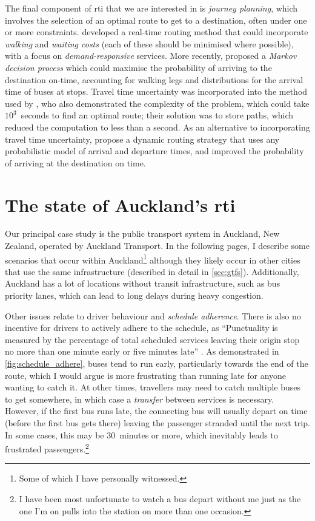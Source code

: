 The final component of \gls{rti} that we are interested in is \emph{journey planning}, which involves the selection of an optimal route to get to a destination, often under one or more constraints.  developed a real-time routing method that could incorporate \emph{walking} and \emph{waiting costs} (each of these should be minimised where possible), with a focus on \emph{demand-responsive} services. More recently, \citet{Hame_2013a,Hame_2013b} proposed a \emph{Markov decision process} which could maximise the probability of arriving to the destination on-time, accounting for walking legs and distributions for the arrival time of buses at stops. Travel time uncertainty was incorporated into the method used by \citet{Zheng_2016}, who also demonstrated the complexity of the problem, which could take $10^3$~seconds to find an optimal route; their solution was to store paths, which reduced the computation to less than a second. As an alternative to incorporating travel time uncertainty, \citet{Berczi_2017} propose a dynamic routing strategy that uses any probabilistic model of arrival and departure times, and improved the probability of arriving at the destination on time.



\section{The state of Auckland's \gls{rti}}
\label{sec:auckland_etas}

Our principal case study is the public transport system in Auckland, New Zealand, operated by Auckland Transport. In the following pages, I describe some scenarios that occur within Auckland\footnote{Some of which I have personally witnessed.} although they likely occur in other cities that use the same infrastructure (described in detail in \cref{sec:gtfs}). Additionally, Auckland has a lot of locations without transit infrastructure, such as bus priority lanes, which can lead to long delays during heavy congestion.


Other issues relate to driver behaviour and \emph{schedule adherence}. There is also no incentive for drivers to actively adhere to the schedule, as ``Punctuality is measured by the percentage of total scheduled services leaving their origin stop no more than one minute early or five minutes late'' \citep[13]{AT_report_2019}. As demonstrated in \cref{fig:schedule_adhere}, buses tend to run early, particularly towards the end of the route, which I would argue is more frustrating than running late for anyone wanting to catch it. At other times, travellers may need to catch multiple buses to get somewhere, in which case a \emph{transfer} between services is necessary. However, if the first bus runs late, the connecting bus will usually depart on time (before the first bus gets there) leaving the passenger stranded until the next trip. In some cases, this may be 30~minutes or more, which inevitably leads to frustrated passengers.\footnote{I have been most unfortunate to watch a bus depart without me just as the one I'm on pulls into the station on more than one occasion.}


